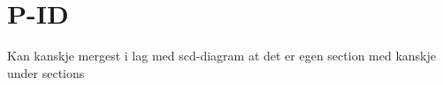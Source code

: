 \section{P-ID}
\thispagestyle{fancy}

Kan kanskje mergest i lag med scd-diagram at det er egen section med kanskje under sections